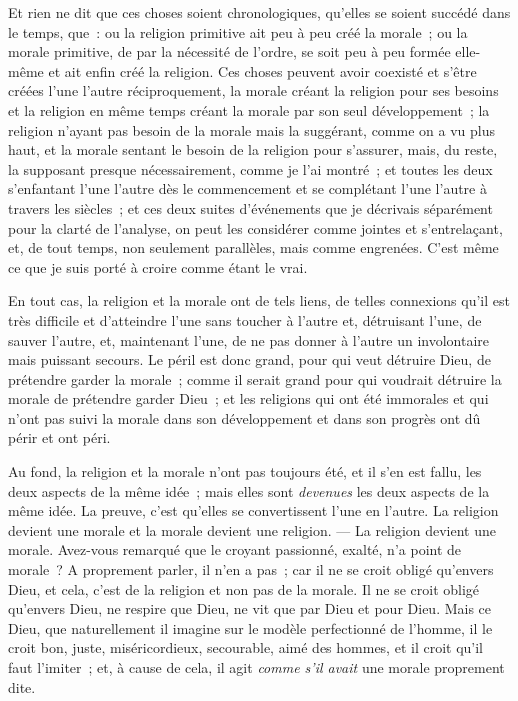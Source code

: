 \documentclass[french,twoside]{book} %
\begin{document}
Et rien ne dit que ces choses soient chronologiques, qu’elles se soient succédé dans le temps, que : ou la religion primitive ait peu à peu créé la morale ; ou la morale primitive, de par la nécessité de l’ordre, se soit peu à peu formée elle-même et ait enfin créé la religion. Ces choses peuvent avoir coexisté et s’être créées l’une l’autre réciproquement, la morale créant la religion pour ses besoins et la religion en même temps créant la morale par son seul développement ; la religion n’ayant pas besoin de la morale mais la suggérant, comme on a vu plus haut, et la morale sentant le besoin de la religion pour s’assurer, mais, du reste, la supposant presque nécessairement, comme je l’ai montré ; et toutes les deux s’enfantant l’une l’autre dès le commencement et se complétant l’une l’autre à travers les siècles ; et ces deux suites d’événements que je décrivais séparément pour la clarté de l’analyse, on peut les considérer comme jointes et s’entrelaçant, et, de tout temps, non seulement parallèles, mais comme engrenées. C’est même ce que je suis porté à croire comme étant le vrai.\par
En tout cas, la religion et la morale ont de tels liens, de telles connexions qu’il est très difficile et d’atteindre l’une sans toucher à l’autre et, détruisant  l’une, de sauver l’autre, et, maintenant l’une, de ne pas donner à l’autre un involontaire mais puissant secours. Le péril est donc grand, pour qui veut détruire Dieu, de prétendre garder la morale ; comme il serait grand pour qui voudrait détruire la morale de prétendre garder Dieu ; et les religions qui ont été immorales et qui n’ont pas suivi la morale dans son développement et dans son progrès ont dû périr et ont péri.\par
Au fond, la religion et la morale n’ont pas toujours été, et il s’en est fallu, les deux aspects de la même idée ; mais elles sont {\itshape devenues} les deux aspects de la même idée. La preuve, c’est qu’elles se convertissent l’une en l’autre. La religion devient une morale et la morale devient une religion. — La religion devient une morale. Avez-vous remarqué que le croyant passionné, exalté, n’a point de morale ? A proprement parler, il n’en a pas ; car il ne se croit obligé qu’envers Dieu, et cela, c’est de la religion et non pas de la morale. Il ne se croit obligé qu’envers Dieu, ne respire que Dieu, ne vit que par Dieu et pour Dieu. Mais ce Dieu, que naturellement il imagine sur le modèle perfectionné de l’homme, il le croit bon, juste, miséricordieux, secourable, aimé des hommes, et il croit qu’il faut l’imiter ; et, à cause de cela, il agit {\itshape comme s’il avait} une morale proprement dite.\par
\end{document}
